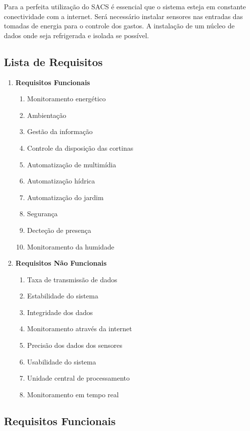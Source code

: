 	Para a perfeita utilização do \gls{SACS} é essencial que o sistema esteja em constante conectividade com a internet. Será necessário instalar sensores nas entradas das tomadas de energia para o controle dos gastos. A instalação de um núcleo de dados onde seja refrigerada e isolada se possível. 

\subsection{Lista de Requisitos}
\begin{enumerate}[I]
	\item \textbf{Requisitos Funcionais}
	\begin{enumerate}[RF 1 -]
		\item Monitoramento energético
		\item Ambientação
		\item Gestão da informação
		\item Controle da disposição das cortinas
		\item Automatização de multimídia
		\item Automatização hídrica
		\item Automatização do jardim
		\item Segurança
		\item Decteção de presença
		\item Monitoramento da humidade
	\end{enumerate}

	\item \textbf{Requisitos Não Funcionais}
	\begin{enumerate}[RNF 1 -]
		\item Taxa de transmissão de dados
		\item Estabilidade do sistema
		\item Integridade dos dados
		\item Monitoramento através da internet
		\item Precisão dos dados dos sensores
		\item Usabilidade do sistema
		\item Unidade central de processamento
		\item Monitoramento em tempo real
	\end{enumerate}
\end{enumerate}

\subsection{Requisitos Funcionais}
